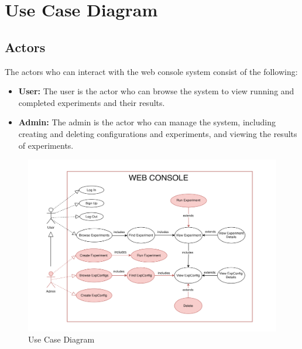 \newpage
\section{Use Case Diagram}
\subsection{Actors}

The actors who can interact with the web console system consist of the following:
\begin{itemize}
    \item \textbf{User:} The user is the actor who can browse the system to view running and completed experiments and their results.
    \item \textbf{Admin:} The admin is the actor who can manage the system, including creating and deleting configurations and experiments, and viewing the results of experiments.
\end{itemize}

\begin{figure}[ht!]
    \centering
    \includegraphics[width=\textwidth]{images/2_analisys/FL_use_case.png}
    \caption{Use Case Diagram}
    \label{fig:use_case_diagram}
\end{figure}

\newpage

